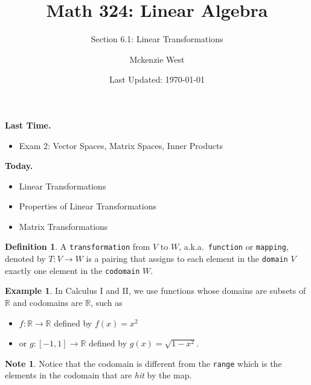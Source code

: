 \documentclass{beamer}
\newcommand{\R}{\mathbb{R}}
\newcommand{\fn}{\insertframenumber}
\theoremstyle{definition}
\newtheorem*{defn}{Definition}
\newtheorem*{exa}{Example}
\newtheorem*{nb}{Note}
\renewcommand{\emph}[1]{{\color{blue}\texttt{#1}}}
\begin{document}
	\title{Math 324: Linear Algebra}
	\subtitle{Section 6.1: Linear Transformations}
	\author{Mckenzie West}
	\date{Last Updated: \today}
\begin{frame}
\maketitle
\end{frame}

\begin{frame}{\insertframenumber}
	\begin{block}{\textbf{Last Time.}}
	\begin{itemize}[label=--]
		\item Exam 2: Vector Spaces, Matrix Spaces, Inner Products
	\end{itemize}
	\end{block}
	\begin{block}{\textbf{Today.}}
		\begin{itemize}[label=--]
			\item Linear Transformations
			\item Properties of Linear Transformations
			\item Matrix Transformations
		\end{itemize}
	\end{block}
\end{frame}
\begin{frame}{\fn}
	\begin{defn}
		A \emph{transformation} from $V$ to $W$, a.k.a.\ \emph{function} or \emph{mapping}, denoted by $T\colon V\to W$ is a pairing that assigns to each element in the \emph{domain} $V$ exactly one element in the \emph{codomain} $W$.
	\end{defn}
	\begin{exa}
		In Calculus I and II, we use functions whose domains are subsets of $\R$ and codomains are $\R$, such as 
			\begin{itemize}[label=--]
				\item $f\colon\R\to\R$ defined by $f(x)=x^2$
				\item or $g\colon[-1,1]\to\R$ defined by $g(x)=\sqrt{1-x^2}$.
			\end{itemize}
	\end{exa}
	\begin{nb}
		Notice that the codomain is different from the \emph{range} which is the elements in the codomain that are \textit{hit} by the map.
	\end{nb}
\end{frame}
\end{document}
